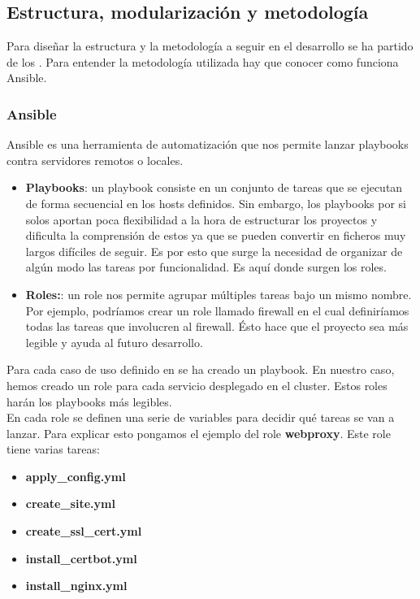 \subsection{Estructura, modularización y metodología}
\begin{text}
	Para diseñar la estructura y la metodología a seguir en el desarrollo se ha partido de los . Para entender la metodología utilizada hay que conocer como funciona Ansible.
	
	\subsubsection{Ansible}
	\label{ansible_}
	\begin{text}
		Ansible es una herramienta de automatización que nos permite lanzar playbooks contra servidores remotos o locales.
		\begin{itemize}
			\item \textbf{Playbooks}: un playbook consiste en un conjunto de tareas que se ejecutan de forma secuencial en los hosts definidos. Sin embargo, los playbooks por si solos aportan poca flexibilidad a la hora de estructurar los proyectos y dificulta la comprensión de estos ya que se pueden convertir en ficheros muy largos difíciles de seguir. Es por esto que surge la necesidad de organizar de algún modo las tareas por funcionalidad. Es aquí donde surgen los roles.
			
			\item \textbf{Roles:}: un role nos permite agrupar múltiples tareas bajo un mismo nombre. Por ejemplo, podríamos crear un role llamado firewall en el cual definiríamos todas las tareas que involucren al firewall. Ésto hace que el proyecto sea más legible y ayuda al futuro desarrollo.
		\end{itemize}
	
	Para cada caso de uso definido en  se ha creado un playbook. En nuestro caso, hemos creado un role para cada servicio desplegado en el cluster. Estos roles harán los playbooks más legibles. \\
	En cada role se definen una serie de variables para decidir qué tareas se van a lanzar. Para explicar esto pongamos el ejemplo del role \textbf{webproxy}. Este role tiene varias tareas:
	\begin{itemize}
		\item \textbf{apply\_config.yml}
		\item \textbf{create\_site.yml}
		\item \textbf{create\_ssl\_cert.yml}
		\item \textbf{install\_certbot.yml}
		\item \textbf{install\_nginx.yml}
	\end{itemize}


\end{text}
\end{text}
